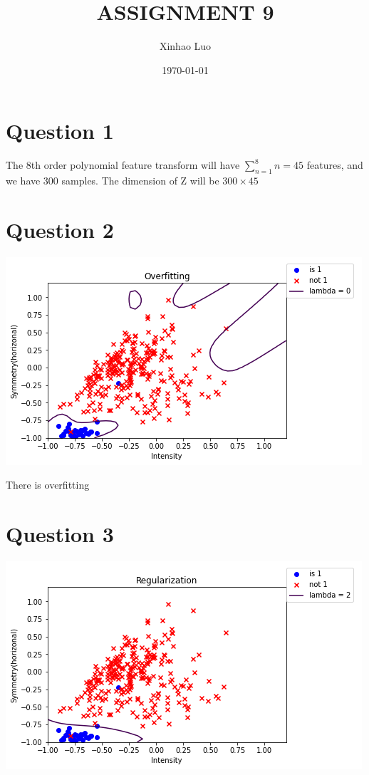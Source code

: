 \documentclass{article}
\title{\bf \Large ASSIGNMENT 9}
\author{Xinhao Luo}
\date{\today}
\def\math#1{$#1$}
\begin{document}
\maketitle
\medskip

\section{Question 1}

The 8th order polynomial feature transform will have \math{\sum_{n=1}^8 n = 45} features, and we have 300 samples. The dimension of Z will be \math{300 \times 45}

\section{Question 2}

\includegraphics[]{2/1}

There is overfitting

\section{Question 3}

\includegraphics[]{3/1}
\end{document}
